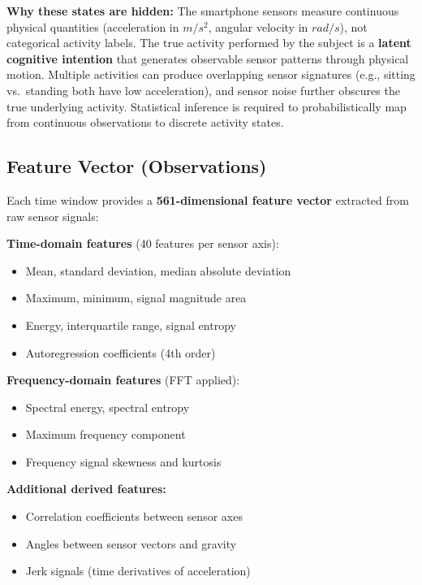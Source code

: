\documentclass[11pt,a4paper]{article}
\begin{document}
\textbf{Why these states are hidden:} The smartphone sensors measure continuous physical quantities (acceleration in $m/s^2$, angular velocity in $rad/s$), not categorical activity labels. The true activity performed by the subject is a \textbf{latent cognitive intention} that generates observable sensor patterns through physical motion. Multiple activities can produce overlapping sensor signatures (e.g., sitting vs.\ standing both have low acceleration), and sensor noise further obscures the true underlying activity. Statistical inference is required to probabilistically map from continuous observations to discrete activity states.

\subsection{Feature Vector (Observations)}

Each time window provides a \textbf{561-dimensional feature vector} extracted from raw sensor signals:

\textbf{Time-domain features} (40 features per sensor axis):
\begin{itemize}[leftmargin=*]
    \item Mean, standard deviation, median absolute deviation
    \item Maximum, minimum, signal magnitude area
    \item Energy, interquartile range, signal entropy
    \item Autoregression coefficients (4th order)
\end{itemize}

\textbf{Frequency-domain features} (FFT applied):
\begin{itemize}[leftmargin=*]
    \item Spectral energy, spectral entropy
    \item Maximum frequency component
    \item Frequency signal skewness and kurtosis
\end{itemize}

\textbf{Additional derived features:}
\begin{itemize}[leftmargin=*]
    \item Correlation coefficients between sensor axes
    \item Angles between sensor vectors and gravity
    \item Jerk signals (time derivatives of acceleration)
\end{itemize}
\end{document}
